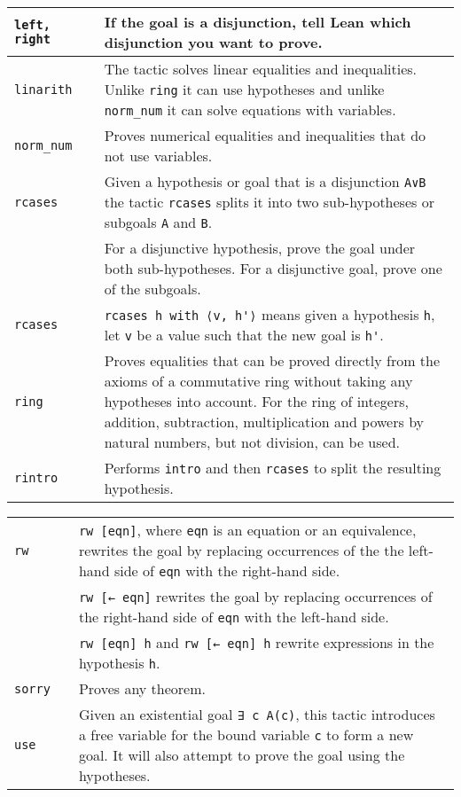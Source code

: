 \begin{tabular}{p{}|r|p{}}
\Verb+left, right+ &\pageref{p.left-right}& If the goal is a disjunction, tell Lean which disjunction you want to prove.\\\hline

\Verb+linarith+&\pageref{p.linarith}&The tactic solves linear equalities and inequalities. Unlike \Verb+ring+ it can use hypotheses and unlike \Verb+norm_num+ it can solve equations with variables.\\\hline

\Verb+norm_num+&\pageref{p.norm-num}&Proves numerical equalities and inequalities that do not use variables.\\\hline

\Verb+rcases+&\pageref{p.rcases}&Given a hypothesis or goal that is a disjunction \Verb+A∨B+ the tactic \Verb+rcases+ splits it into two sub-hypotheses or subgoals \Verb+A+ and \Verb+B+.\\
&&For a disjunctive hypothesis, prove the goal under both sub-hypotheses. For a disjunctive goal, prove one of the subgoals.\\\hline

\Verb+rcases+&\pageref{p.rcases-with}&\Verb+rcases h with ⟨v, h'⟩+ means given a hypothesis \Verb+h+, let \Verb+v+ be a value such that the new goal is \Verb+h'+.\\\hline

\Verb+ring+&&Proves equalities that can be proved directly from the axioms of a commutative ring without taking any hypotheses into account. For the ring of integers, addition, subtraction, multiplication and powers by natural numbers, but not division, can be used.\\\hline

\Verb+rintro+&\pageref{p.rintro}&Performs \Verb+intro+ and then \Verb+rcases+ to split the resulting hypothesis.\\\hline
\end{tabular}

\begin{tabular}{p{}|r|p{}}
\hline
\Verb+rw+&\pageref{p.rw}&\Verb+rw [eqn]+, where \Verb+eqn+ is an equation or an equivalence, rewrites the goal by replacing occurrences of the the left-hand side of \Verb+eqn+ with the right-hand side.\\
&&\Verb+rw [← eqn]+ rewrites the goal by replacing occurrences of the right-hand side of \Verb+eqn+ with the left-hand side.\\
&&\Verb+rw [eqn] h+ and \Verb+rw [← eqn] h+ rewrite expressions in the hypothesis \Verb+h+.\\\hline

\Verb+sorry+&\pageref{p.sorry}&Proves any theorem.\\\hline

\Verb+use+&\pageref{p.use}&Given an existential goal \Verb+∃ c A(c)+, this tactic introduces a free variable for the bound variable \Verb+c+ to form a new goal. It will also attempt to prove the goal using the hypotheses.\\\hline

\end{tabular}
